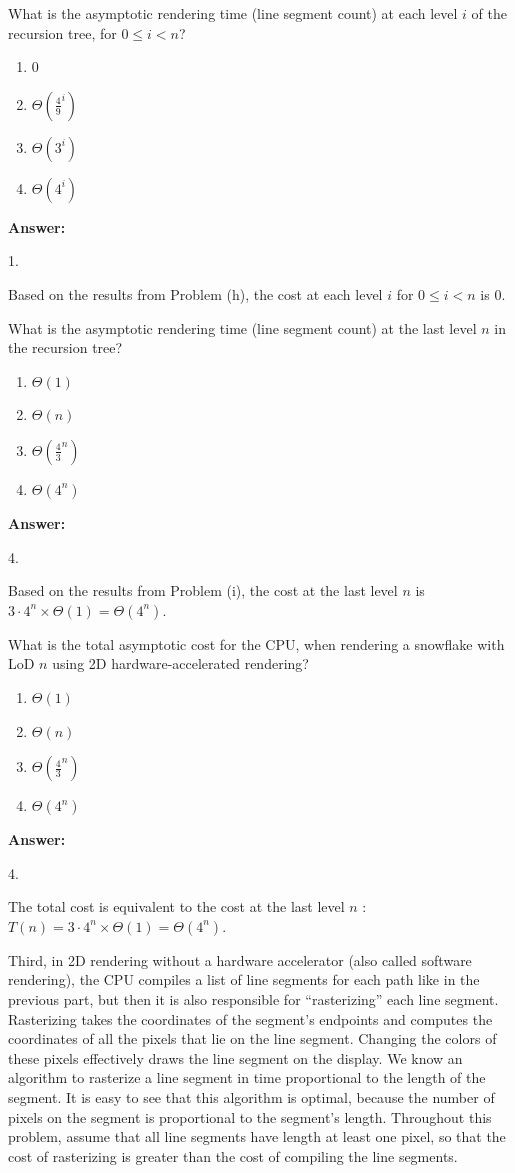 \documentclass[12pt,twoside]{article}
\newcommand{\answer}{
 \par\medskip
 \textbf{Answer:}
}
\newcommand{\answerIj}{ \answer
{\color{blue}1.

Based on the results from Problem (h), the cost at each level
 $i$ for $0 \le i < n$ is 0.}
}
\newcommand{\answerIk}{ \answer
{\color{blue}4.

Based on the results from Problem (i), the cost at the last level
 $n$ is $3 \cdot 4^n \times \Theta(1) = \Theta(4^n)$.}
}
\newcommand{\answerIl}{ \answer
{\color{blue}4.

The total cost is equivalent to  the cost at the last level
 $n$ : $T(n) = 3 \cdot 4^n \times \Theta(1) = \Theta(4^n)$.}
}
\begin{document}
\begin{problems}
\begin{problemparts}
  \problempart {} What is the asymptotic rendering time (line segment count) at
  each level $i$ of the recursion tree, for $0 \le i < n$?
    \begin{enumerate}
      \item 0
      \item $\Theta(\frac{4}{9} ^ i)$
      \item $\Theta(3 ^ i)$
      \item $\Theta(4 ^ i)$
    \end{enumerate}
\answerIj

  \problempart {} What is the asymptotic rendering time (line segment count) at
  the last level $n$ in the recursion tree?
    \begin{enumerate}
      \item $\Theta(1)$
      \item $\Theta(n)$
      \item $\Theta(\frac{4}{3}^n)$
      \item $\Theta(4^n)$
    \end{enumerate}
\answerIk

  \problempart {} What is the total asymptotic cost for the CPU, when rendering
  a snowflake with LoD $n$ using 2D hardware-accelerated rendering?
    \begin{enumerate}
      \item $\Theta(1)$
      \item $\Theta(n)$
      \item $\Theta(\frac{4}{3}^n)$
      \item $\Theta(4^n)$
    \end{enumerate}
\answerIl

\end{problemparts}

Third, in 2D rendering without a hardware accelerator (also called
software rendering), the CPU compiles a list of line segments for each path like
in the previous part, but then it is also responsible for ``rasterizing'' each
line segment. Rasterizing takes the coordinates of the segment's endpoints and
computes the coordinates of all the pixels that lie on the line segment.
Changing the colors of these pixels effectively draws the line segment on the
display. We know an algorithm to rasterize a line segment in time proportional
to the length of the segment. It is easy to see that this algorithm is optimal,
because the number of pixels on the segment is proportional to the segment's
length. Throughout this problem, assume that all line segments have length
at least one pixel, so that the cost of rasterizing is greater than the cost
of compiling the line segments.


\end{problems}
\end{document}
